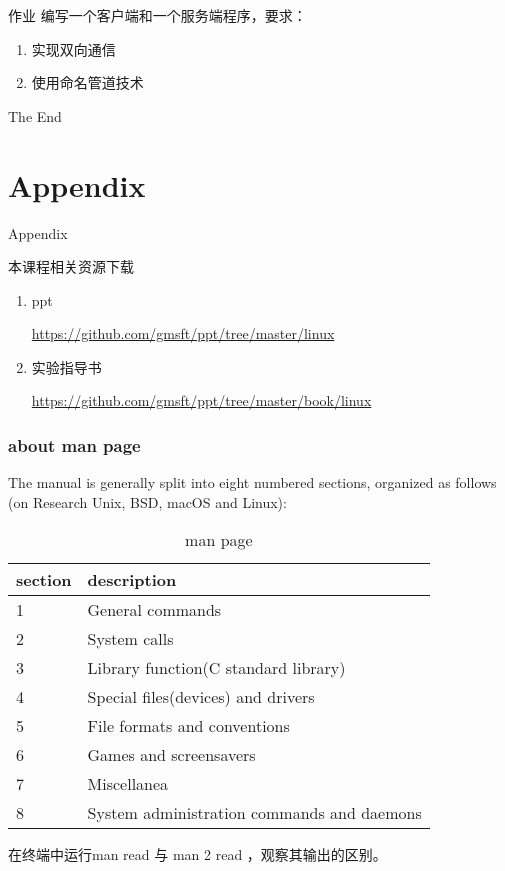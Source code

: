 \documentclass{beamer}
\begin{document}
\begin{frame}{作业}
编写一个客户端和一个服务端程序，要求：
\begin{enumerate}
\item
实现双向通信
\item
使用命名管道技术

\end{enumerate}
\end{frame}

\begin{frame}
\Huge{\centerline{The End}}
\end{frame}



\section{Appendix}
\begin{frame}
\Huge{\centerline{Appendix}}
\end{frame}
\begin{frame}{本课程相关资源下载}
\begin{enumerate}
\item
ppt

\url{https://github.com/gmsft/ppt/tree/master/linux}
\item
实验指导书

\url{https://github.com/gmsft/ppt/tree/master/book/linux}
\end{enumerate}
\end{frame}
\begin{frame}
\frametitle{about man page}
The manual is generally split into eight numbered sections, organized as follows (on Research Unix, BSD, macOS and Linux):
\begin{table}
\begin{tabular}{ll}
\toprule
\textbf{section} & \textbf{description} \\
\midrule
1 & General commands\\
2 & System calls\\
3 & Library function(C standard library)\\
4 & Special files(devices) and drivers\\
5 & File formats and conventions\\
6 & Games and screensavers\\
7 & Miscellanea\\
8 & System administration commands and daemons\\  
\bottomrule
\end{tabular}
\caption{man page}
\end{table}

在终端中运行man read 与 man 2 read ，观察其输出的区别。
\end{frame}
\end{document}
